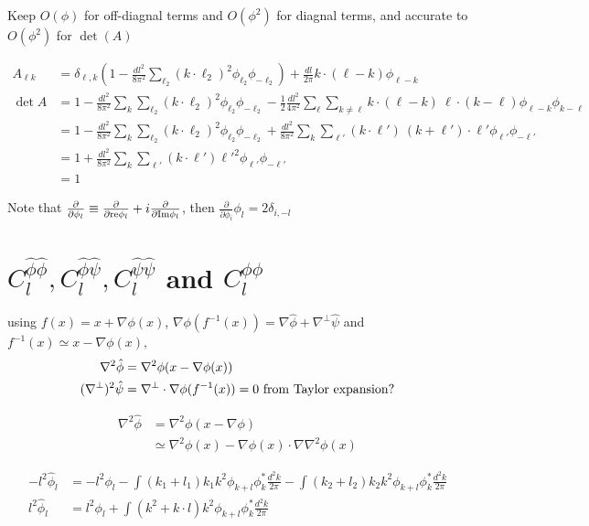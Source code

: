 \documentclass[noinfoline]{imsart}
\newcommand{\pinv}{\hat\phi}
\newcommand{\sinv}{\hat\psi}
\begin{document}
Keep $O(\phi)$ for off-diagnal terms and $O(\phi^2)$ for diagnal terms, and accurate to $O(\phi^2)$ for $\det (A)$

\begin{align}
A_{\ell k}
&= \delta_{\ell,k} \left(1-\frac{dl^2}{8\pi^2}\sum_{\ell_2}   (k\cdot\ell_2)^2
  \phi_{\ell_2}\phi_{-\ell_2} \right) + \frac{dl}{2\pi} k\cdot(\ell-k)\phi_{\ell-k}\\
\det A
&=1-\frac{dl^2}{8\pi^2}\sum_k\sum_{\ell_2}   (k\cdot\ell_2)^2 \phi_{\ell_2}\phi_{-\ell_2}
-\frac{1}{2} \frac{dl^2}{4\pi^2} \sum_\ell \sum_{k\neq\ell} k\cdot(\ell-k)\ \ell\cdot(k-\ell)\phi_{\ell-k}\phi_{k-\ell}\nonumber\\
&=1-\frac{dl^2}{8\pi^2}\sum_k\sum_{\ell_2}   (k\cdot\ell_2)^2 \phi_{\ell_2}\phi_{-\ell_2}
+\frac{dl^2}{8\pi^2} \sum_k \sum_{\ell'}  (k\cdot\ell')\ (k+\ell')\cdot\ell'\phi_{\ell'}\phi_{-\ell'}\nonumber\\
&=1+\frac{dl^2}{8\pi^2} \sum_k \sum_{\ell'} (k\cdot\ell') {\ell'}^2 \phi_{\ell'}\phi_{-\ell'} \nonumber\\
&=1
\end{align}

Note that $\frac{\partial}{\partial \phi_l}
\equiv \frac{\partial}{\partial{\rm re} \phi_l} +i\frac{\partial}{\partial{\rm Im} \phi_l} $, then
$\frac{\partial}{\partial \phi_i} \phi_{l} = 2 \delta_{i,-l}$

\section{$C_l^{\pinv\pinv}, C_l^{\pinv\sinv}, C_l^{\sinv\sinv}$ and $C_l^{\phi\phi}$}

using $f(x) = x + \nabla\phi(x)$, $\nabla\phi(f^{-1}(x)) = \nabla\pinv + \nabla^\perp \sinv$ and  $ f^{-1}(x)\simeq x -\nabla\phi(x),$
\begin{align}
  \nabla^2\pinv &= \nabla^2\phi(x-\nabla\phi(x)) \nonumber\\
  (\nabla^{\perp})^2\sinv &= \nabla^\perp \cdot \nabla \phi(f^{-1}(x)) = 0 {\rm\ from \ Taylor\ expansion}?
\end{align}

\begin{align}
  \nabla^2\pinv
  &= \nabla^2\phi(x-\nabla\phi)\nonumber\\
  &\simeq \nabla^2 \phi(x)- \nabla\phi(x)\cdot \nabla\nabla^2 \phi(x)
\end{align}


\begin{align}
  -l^2\pinv_l&=-l^2\phi_l - \int (k_1+l_1) k_1 k^2\phi_{k+l}\phi_k^* \frac{d^2k}{2\pi} - \int (k_2+l_2) k_2 k^2\phi_{k+l}\phi_k^* \frac{d^2k}{2\pi}\nonumber\\
  l^2\pinv_l &= l^2\phi_l + \int (k^2+k\cdot l) k^2\phi_{k+l}\phi_k^* \frac{d^2k}{2\pi}
\end{align}
\end{document}
